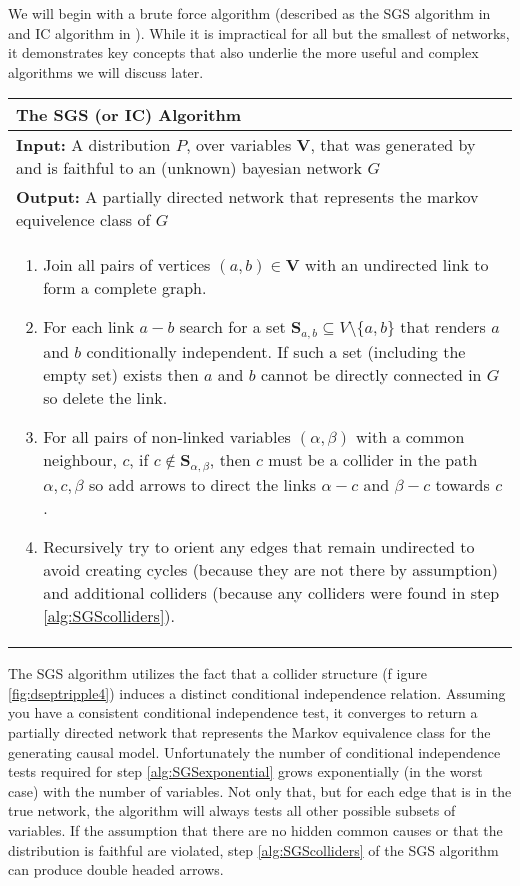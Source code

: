 \documentclass[11pt,a4paper]{article}
\begin{document}
We will begin with a brute force algorithm (described as the SGS algorithm in \cite{Sprites} and IC algorithm in \cite{Pearl2000}). While it is impractical for all but the smallest of networks, it demonstrates key concepts that also underlie the more useful and complex algorithms we will discuss later. 

\begin{table}[H]
 \begin{tabularx}{\textwidth}{X}
 \hline
\rule{0pt}{2.5ex} 
 \textbf{The SGS (or IC) Algorithm}\\
 \hline
 \rule{0pt}{2.5ex}
\textbf{Input:} A distribution $P$, over variables $\boldsymbol{V}$, that was generated by and is faithful to an (unknown) bayesian network $G$\\
\textbf{Output:} A partially directed network that represents the markov equivelence class of $G$\\
 \begin{enumerate}[itemsep=8pt]
  \item Join all pairs of vertices $(a,b) \in \boldsymbol{V}$ with an undirected link to form a complete graph.
  \item For each link $a-b$ search for a set $\boldsymbol{S}_{a,b} \subseteq V \setminus \{a,b\}$ that renders $a$ and $b$ conditionally independent. If such a set (including the empty set) exists then $a$ and $b$ cannot be directly connected in $G$ so delete the link.
  \label{alg:SGSexponential}
  
  \item For all pairs of non-linked variables $(\alpha,\beta)$ with a common neighbour, $c$, if $c \notin \boldsymbol{S}_{\alpha,\beta}$, then $c$ must be a collider in the path $\alpha,c,\beta$ so  add arrows to direct the links $\alpha-c$ and $\beta-c$ towards $c$.
  \label{alg:SGScolliders}  
  \item Recursively try to orient any edges that remain undirected to avoid creating cycles (because they are not there by assumption) and additional colliders (because any colliders were found in step \ref{alg:SGScolliders}).
  \label{alg:SGSfinal}
\end{enumerate}\\
 \hline
\end{tabularx}
\end{table}

The SGS algorithm utilizes the fact that a collider structure (f
igure \ref{fig:dseptripple4}) induces a distinct conditional independence relation. Assuming you have a consistent conditional independence test, it converges to return a partially directed network that represents the Markov equivalence class for the generating causal model. Unfortunately the number of conditional independence tests required for step \ref{alg:SGSexponential} grows exponentially (in the worst case) with the number of variables. Not only that, but for each edge that is in the true network, the algorithm will always tests all other possible subsets of variables. If the assumption that there are no hidden common causes or that the distribution is faithful are violated, step \ref{alg:SGScolliders} of the SGS algorithm can produce double headed arrows.
\end{document}
